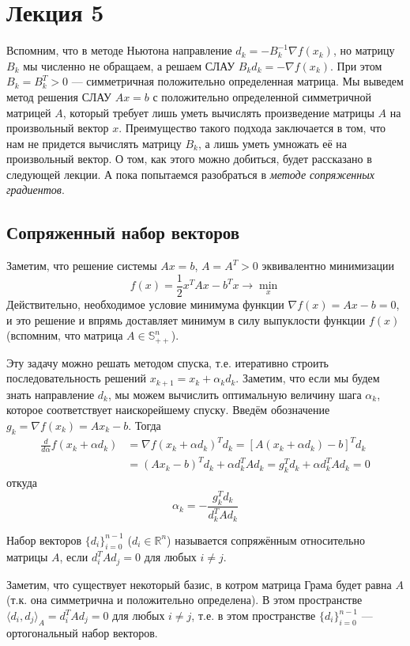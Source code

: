 \documentclass[a4paper, 12pt]{article}
\begin{document}
\section{Лекция 5}

Вспомним, что в методе Ньютона направление $d_k = -B_k^{-1}\nabla f(x_k)$, но матрицу $B_k$ мы численно не обращаем, а решаем СЛАУ $B_k d_k = -\nabla f(x_k)$. При этом $B_k = B_k^T > 0$ --- симметричная положительно определенная матрица. Мы выведем метод решения СЛАУ $Ax = b$ с положительно определенной симметричной матрицей $A$, который требует лишь уметь вычислять произведение матрицы $A$ на произвольный вектор $x$. Преимущество такого подхода заключается в том, что нам не придется вычислять матрицу $B_k$, а лишь уметь умножать её на произвольный вектор. О том, как этого можно добиться, будет рассказано в следующей лекции. А пока попытаемся разобраться в \textit{методе сопряженных градиентов}.

\subsection{Сопряженный набор векторов}
Заметим, что решение системы $Ax = b$, $A = A^T > 0$ эквивалентно минимизации
$$f(x) = \frac{1}{2} x^T A x - b^T x \to \min_x$$
Действительно, необходимое условие минимума функции $\nabla f(x) = Ax - b = 0$, и это решение и впрямь доставляет минимум в силу выпуклости функции $f(x)$ (вспомним, что матрица $A \in \mathbb{S}^n_{++}$).

Эту задачу можно решать методом спуска, т.е. итеративно строить последовательность решений $x_{k+1} = x_k + \alpha_k d_k$. Заметим, что если мы будем знать направление $d_k$, мы можем вычислить оптимальную величину шага $\alpha_k$, которое соответствует наискорейшему спуску. Введём обозначение $g_k = \nabla f(x_k) = Ax_k - b$. Тогда
\begin{align*}
\frac{d}{d\alpha} f(x_k + \alpha d_k) &= \nabla f(x_k + \alpha d_k) ^T d_k = [A(x_k + \alpha d_k) - b]^T d_k \\ &= (Ax_k - b)^T d_k + \alpha d_k^T A d_k = g_k^T d_k + \alpha d_k^T A d_k = 0
\end{align*}
откуда
$$\boxed{\alpha_k = -\frac{g_k^T d_k}{d_k^T A d_k}}$$

\begin{Def}
Набор векторов $\{d_i\}_{i=0}^{n-1}$ ($d_i \in \mathbb{R}^n$) называется сопряжённым относительно матрицы $A$, если $d_i^TAd_j = 0$ для любых $i \neq j$.
\end{Def}
\begin{Comment}
Заметим, что существует некоторый базис, в котром матрица Грама будет равна $A$ (т.к. она симметрична и положительно определена). В этом пространстве $\langle d_i, d_j \rangle_A = d_i^T A d_j = 0$ для любых $i \neq j$, т.е. в этом пространстве $\{d_i\}_{i=0}^{n-1}$ --- ортогональный набор векторов.
\end{Comment}
\end{document}
